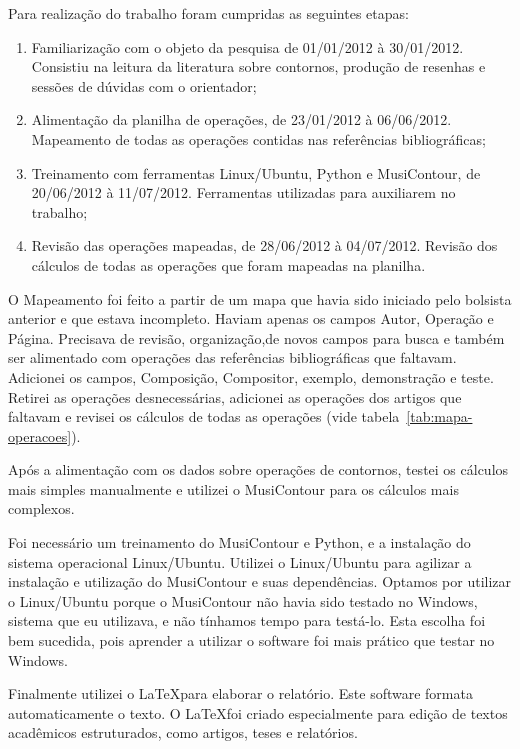 \documentclass[11pt]{article}
\begin{document}
Para realização do trabalho foram cumpridas as seguintes etapas:

\begin{enumerate}
\item Familiarização com o objeto da pesquisa de 01/01/2012 à
  30/01/2012.  Consistiu na leitura da literatura sobre contornos,
  produção de resenhas e sessões de dúvidas com o orientador;
\item Alimentação da planilha de operações, de 23/01/2012 à
  06/06/2012.  Mapeamento de todas as operações contidas nas
  referências bibliográficas;
\item Treinamento com ferramentas Linux/Ubuntu, Python e MusiContour,
  de 20/06/2012 à 11/07/2012.  Ferramentas utilizadas para auxiliarem
  no trabalho;
\item Revisão das operações mapeadas, de 28/06/2012 à 04/07/2012.
  Revisão dos cálculos de todas as operações que foram mapeadas na
  planilha.
\end{enumerate}

O Mapeamento foi feito a partir de um mapa que havia sido iniciado
pelo bolsista anterior e que estava incompleto.
Haviam apenas os campos Autor, Operação e Página.
Precisava de revisão, organização,de novos campos para busca e também
ser alimentado com operações das referências bibliográficas que
faltavam. Adicionei os campos, Composição, Compositor, exemplo,
demonstração e teste. Retirei as operações desnecessárias, adicionei
as operações dos artigos que faltavam e revisei os cálculos de todas
as operações (vide tabela~\ref{tab:mapa-operacoes}).

Após a alimentação com os dados sobre operações de contornos, testei
os cálculos mais simples manualmente e utilizei o MusiContour para os
cálculos mais complexos.

Foi necessário um treinamento do MusiContour e Python, e a instalação
do sistema operacional Linux/Ubuntu. Utilizei o Linux/Ubuntu para
agilizar a instalação e utilização do MusiContour e suas dependências.
Optamos por utilizar o Linux/Ubuntu porque o MusiContour não havia
sido testado no Windows, sistema que eu utilizava, e não tínhamos
tempo para testá-lo. Esta escolha foi bem sucedida, pois aprender a
utilizar o software foi mais prático que testar no Windows.

Finalmente utilizei o \LaTeX para elaborar o relatório. Este software
formata automaticamente o texto. O \LaTeX foi criado especialmente
para edição de textos acadêmicos estruturados, como artigos, teses e
relatórios.
\end{document}
